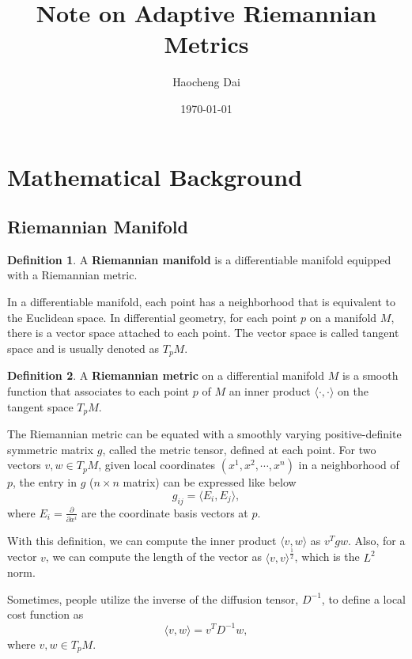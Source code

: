 \documentclass{article}
\title{Note on Adaptive Riemannian Metrics}
\author{Haocheng Dai }
\date{\today}
\theoremstyle{definition}
\newtheorem{definition}{Definition}
\theoremstyle{plain}
\begin{document}
\maketitle

\section{Mathematical Background}
\subsection{Riemannian Manifold}
\begin{definition} 
A \textbf{Riemannian manifold} is a differentiable manifold equipped with a Riemannian metric. 

In a differentiable manifold, each point has a neighborhood that is equivalent to the Euclidean space. In differential geometry, for each point $p$ on a manifold $M$, there is a vector space attached to each point. The vector space is called tangent space and is usually denoted as $T_pM$.
\end{definition}

\begin{definition}
A \textbf{Riemannian metric} on a differential manifold $M$ is a smooth function that associates to each point $p$ of $M$ an inner product $\langle\cdot,\cdot\rangle$ on the tangent space $T_pM$.
\end{definition}
The Riemannian metric can be equated with a smoothly varying positive-definite symmetric matrix $g$, called the metric tensor, defined at each point. For two vectors $v,w\in T_pM$, given local coordinates $(x^1, x^2,\cdots,x^n)$ in a neighborhood of $p$, the entry in $g$ ($n\times n$ matrix) can be expressed like below
\begin{equation*}
    g_{ij}=\langle E_i,E_j\rangle,
\end{equation*}
where $E_i=\frac{\partial}{\partial x^i}$ are the coordinate basis vectors at $p$.

With this definition, we can compute the inner product $\langle v,w\rangle$ as $v^Tgw$. Also, for a vector $v$, we can compute the length of the vector as $\langle v,v\rangle^\frac{1}{2}$, which is the $L^2$ norm.

Sometimes, people utilize the inverse of the diffusion tensor, $D^{-1}$, to define a local cost function as
\begin{equation*}
    \langle v,w\rangle=v^TD^{-1}w,
\end{equation*}
where $v, w\in T_pM$.
\end{document}
